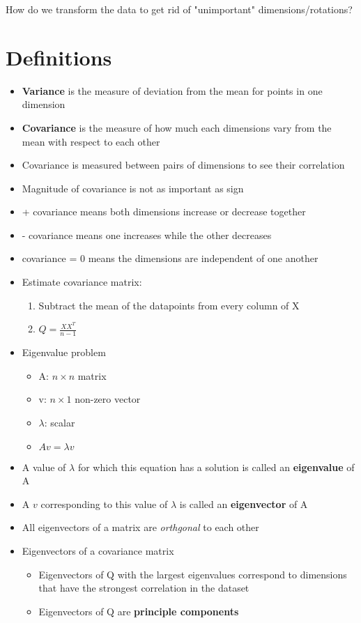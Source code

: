 \documentclass[../main.tex]{subfiles}
\begin{document}
    How do we transform the data to get rid of "unimportant" dimensions/rotations?
    \section{Definitions}
    \begin{itemize}
        \item \textbf{Variance} is the measure of deviation from the mean for points in one dimension
        \item \textbf{Covariance} is the measure of how much each dimensions vary from the mean with respect to each other
        \item Covariance is measured between pairs of dimensions to see their correlation
        \item Magnitude of covariance is not as important as sign
        \item + covariance means both dimensions increase or decrease together
        \item - covariance means one increases while the other decreases
        \item covariance = 0 means the dimensions are independent of one another
        \item Estimate covariance matrix:
        \begin{enumerate}
            \item Subtract the mean of the datapoints from every column of X
            \item $Q = \frac{XX^{T}}{n - 1}$
        \end{enumerate}
        \item Eigenvalue problem
        \begin{itemize}
            \item A: $n \times n$ matrix
            \item v: $n \times 1$ non-zero vector
            \item $\lambda$: scalar
            \item $Av = \lambda v$
        \end{itemize}
        \item A value of $\lambda$ for which this equation has a solution is called an \textbf{eigenvalue} of A
        \item A $v$ corresponding to this value of $\lambda$ is called an \textbf{eigenvector} of A
        \item All eigenvectors of a matrix are \textit{orthgonal} to each other
        \item Eigenvectors of a covariance matrix
        \begin{itemize}
            \item Eigenvectors of Q with the largest eigenvalues correspond to dimensions that have the strongest correlation in the dataset
            \item Eigenvectors of Q are \textbf{principle components}
        \end{itemize}
    \end{itemize}
\end{document}

